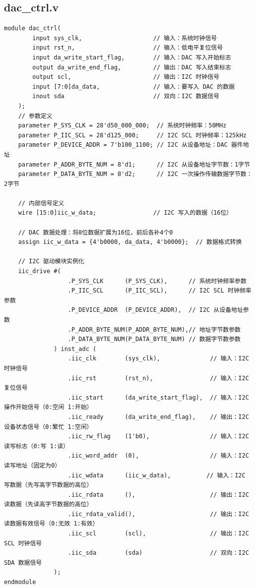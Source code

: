 \documentclass[a4paper,10pt]{article}
\begin{document}
\subsection{dac_ctrl.v}
\begin{lstlisting}[caption=dac_ctrl.v]
module dac_ctrl(
        input sys_clk,                    // 输入：系统时钟信号
        input rst_n,                      // 输入：低电平复位信号
        input da_write_start_flag,        // 输入：DAC 写入开始标志
        output da_write_end_flag,         // 输出：DAC 写入结束标志
        output scl,                       // 输出：I2C 时钟信号
        input [7:0]da_data,               // 输入：要写入 DAC 的数据
        inout sda                         // 双向：I2C 数据信号
    );
    // 参数定义
    parameter P_SYS_CLK = 28'd50_000_000;  // 系统时钟频率：50MHz
    parameter P_IIC_SCL = 28'd125_000;     // I2C SCL 时钟频率：125kHz
    parameter P_DEVICE_ADDR = 7'b100_1100; // I2C 从设备地址：DAC 器件地址
    parameter P_ADDR_BYTE_NUM = 8'd1;      // I2C 从设备地址字节数：1字节
    parameter P_DATA_BYTE_NUM = 8'd2;      // I2C 一次操作传输数据字节数：2字节

    // 内部信号定义
    wire [15:0]iic_w_data;                // I2C 写入的数据（16位）

    // DAC 数据处理：将8位数据扩展为16位，前后各补4个0
    assign iic_w_data = {4'b0000, da_data, 4'b0000};  // 数据格式转换

    // I2C 驱动模块实例化
    iic_drive #(
                  .P_SYS_CLK      (P_SYS_CLK),      // 系统时钟频率参数
                  .P_IIC_SCL      (P_IIC_SCL),      // I2C SCL 时钟频率参数
                  .P_DEVICE_ADDR  (P_DEVICE_ADDR),  // I2C 从设备地址参数
                  .P_ADDR_BYTE_NUM(P_ADDR_BYTE_NUM),// 地址字节数参数
                  .P_DATA_BYTE_NUM(P_DATA_BYTE_NUM) // 数据字节数参数
              ) inst_adc (
                  .iic_clk        (sys_clk),              // 输入：I2C 时钟信号
                  .iic_rst        (rst_n),                // 输入：I2C 复位信号
                  .iic_start      (da_write_start_flag),  // 输入：I2C 操作开始信号（0:空闲 1:开始）
                  .iic_ready      (da_write_end_flag),    // 输出：I2C 设备状态信号（0:繁忙 1:空闲）
                  .iic_rw_flag    (1'b0),                 // 输入：I2C 读写标志（0:写 1:读）
                  .iic_word_addr  (0),                    // 输入：I2C 读写地址（固定为0）
                  .iic_wdata      (iic_w_data),          // 输入：I2C 写数据（先写高字节数据的高位）
                  .iic_rdata      (),                     // 输出：I2C 读数据（先读高字节数据的高位）
                  .iic_rdata_valid(),                     // 输出：I2C 读数据有效信号（0:无效 1:有效）
                  .iic_scl        (scl),                  // 输出：I2C SCL 时钟信号
                  .iic_sda        (sda)                   // 双向：I2C SDA 数据信号
              );
endmodule

\end{lstlisting}
\end{document}
